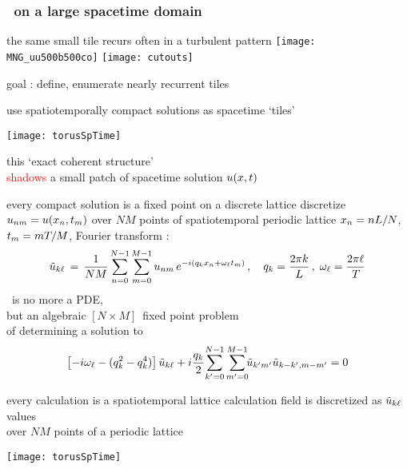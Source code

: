 \begin{frame}
    \frametitle{\KS\ on a large spacetime domain}
\begin{block}{the same small tile recurs often in a turbulent pattern}
\texttt{[image: MNG\_uu500b500co]}
\texttt{[image: cutouts]}
\end{block}
goal : define, enumerate nearly recurrent tiles
\end{frame}

\begin{frame}{use spatiotemporally compact solutions as spacetime `tiles'}
\begin{center}
\texttt{[image: torusSpTime]}
\end{center}
this `exact coherent structure'\\
\textcolor{red}{shadows} a small patch of spacetime solution $u( x, t)$
\end{frame}

\begin{frame}{every compact solution is a fixed point on a discrete lattice}
discretize $u_{nm} = u(x_n,t_m)$ over
$N M$ points of spatiotemporal periodic lattice $x_n = n L/N$,
 $t_m = m {T_{}}/M$, Fourier transform :
%
\[
\tilde{u}_{k\ell} \,=\,
  \frac{1}{NM} \sum^{N-1}_{n=0} \sum^{M-1}_{m=0}
  u_{nm} \, e^{-i(q_kx_n + \omega_\ell t_m)}
    \,,\quad
q_k = \frac{2 \pi k}{L}
    \,,\;
\omega_\ell = \frac{2 \pi \ell}{{T_{}}}
\]
\KS\ is no more a PDE, \\
but an algebraic $[N\!\times\!M]$\dmn\ fixed point problem \\
of determining a solution to
\[
\left[- i \omega_\ell - ( q_k^2 - q_k^4 ) \right]\tilde{u}_{k\ell}
+ i \frac{q_k}{2} \!\sum_{k'=0}^{N-1} \sum^{M-1}_{m'=0}\!\!
\tilde{u}_{k'm'} \tilde{u}_{k-k',m-m'}
    =
0
\]
\end{frame}

\begin{frame}{every calculation is a spatiotemporal lattice calculation}
field is discretized as
$\tilde{u}_{k\ell}$ values  \\ over
$N M$ points of a periodic lattice


\begin{center}
\texttt{[image: torusSpTime]}
\end{center}
\end{frame}


